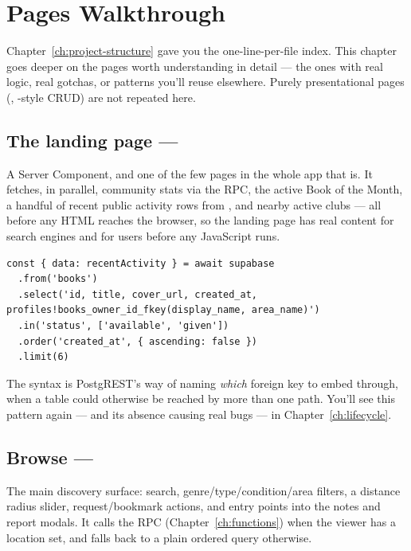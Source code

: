 \chapter{Pages Walkthrough}
\label{ch:pages}

Chapter~\ref{ch:project-structure} gave you the one-line-per-file index. This chapter goes deeper on the pages worth understanding in detail — the ones with real logic, real gotchas, or patterns you'll reuse elsewhere. Purely presentational pages (, -style CRUD) are not repeated here.

\section{The landing page — }

A Server Component, and one of the few pages in the whole app that is. It fetches, in parallel, community stats via the  RPC, the active Book of the Month, a handful of recent public activity rows from , and nearby active clubs — all before any HTML reaches the browser, so the landing page has real content for search engines and for users before any JavaScript runs.

\begin{lstlisting}[caption={Disambiguating a foreign-key embed — app/page.tsx}]
const { data: recentActivity } = await supabase
  .from('books')
  .select('id, title, cover_url, created_at, profiles!books_owner_id_fkey(display_name, area_name)')
  .in('status', ['available', 'given'])
  .order('created_at', { ascending: false })
  .limit(6)
\end{lstlisting}

The  syntax is PostgREST's way of naming \emph{which} foreign key to embed through, when a table could otherwise be reached by more than one path. You'll see this pattern again — and its absence causing real bugs — in Chapter~\ref{ch:lifecycle}.

\section{Browse — }

The main discovery surface: search, genre/type/condition/area filters, a distance radius slider, request/bookmark actions, and entry points into the notes and report modals. It calls the  RPC (Chapter~\ref{ch:functions}) when the viewer has a location set, and falls back to a plain ordered query otherwise.

